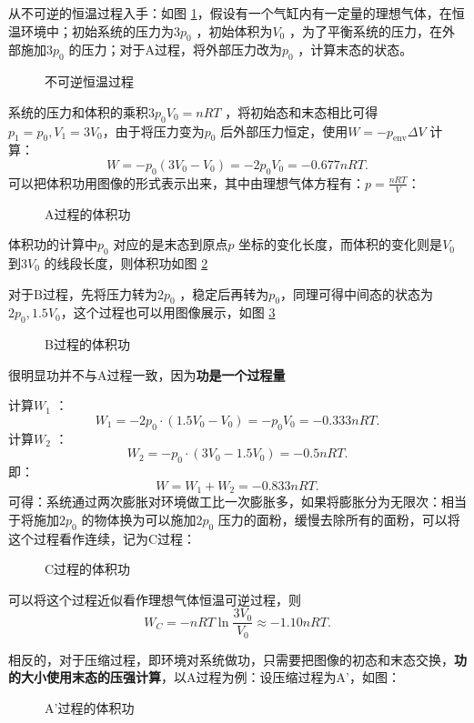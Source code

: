 \begin{eg}
    从不可逆的恒温过程入手：如图 \ref{fig:不可逆恒温过程}，假设有一个气缸内有一定量的理想气体，在恒温环境中；初始系统的压力为$3p_0$ ，初始体积为$V_0$ ，为了平衡系统的压力，在外部施加$3p_0$ 的压力；对于A过程，将外部压力改为$p_0$ ，计算末态的状态。
\begin{figure}[ht!]
    \centering
    \caption{不可逆恒温过程}
    \label{fig:不可逆恒温过程}
\end{figure}

    系统的压力和体积的乘积$3p_0V_0 = nRT $ ，将初始态和末态相比可得$p_1 =p_0, V_1 = 3V_0$，由于将压力变为$p_0$ 后外部压力恒定，使用$W=-p_\text{env}\Delta V$ 计算：\[
        W = -p_0\left( 3V_0-V_0 \right) = -2p_0V_0 = -0.677nRT 
    .\]
    可以把体积功用图像的形式表示出来，其中由理想气体方程有：$p=\frac{nRT }{V}$：
\begin{figure}[ht!]
    \centering
    \caption{A过程的体积功}
    \label{fig:a过程的体积功}
\end{figure}

体积功的计算中$p_0$ 对应的是末态到原点$p$ 坐标的变化长度，而体积的变化则是$V_0$ 到$3V_0$ 的线段长度，则体积功如图 \ref{fig:a过程的体积功}

对于B过程，先将压力转为$2p_0$ ，稳定后再转为$p_0$，同理可得中间态的状态为$2p_0,1.5V_0$，这个过程也可以用图像展示，如图 \ref{fig:b过程的体积功}
\begin{figure}[ht!]
    \centering
    \caption{B过程的体积功}
    \label{fig:b过程的体积功}
\end{figure}

很明显功并不与A过程一致，因为\textbf{功是一个过程量}

计算$W_1$ ：\[
    W_1 = -2p_0\cdot \left( 1.5V_0-V_0 \right) = -p_0V_0 = -0.333nRT 
.\]
计算$W_2$ ：\[
    W_2 = -p_0\cdot \left( 3V_0-1.5V_0 \right) = -0.5nRT 
.\]
即：\[
    W = W_1 + W_2 = -0.833nRT 
.\]
可得：系统通过两次膨胀对环境做工比一次膨胀多，如果将膨胀分为无限次：相当于将施加$2p_0$ 的物体换为可以施加$2p_0$ 压力的面粉，缓慢去除所有的面粉，可以将这个过程看作连续，记为C过程：
\begin{figure}[ht!]
    \centering
    \caption{C过程的体积功}
    \label{fig:c过程的体积功}
\end{figure}

可以将这个过程近似看作理想气体恒温可逆过程，则 \[
    W_C = -nRT \ln \frac{3V_0}{V_0} \approx -1.10nRT 
.\]
\end{eg}
相反的，对于压缩过程，即环境对系统做功，只需要把图像的初态和末态交换，\textbf{功的大小使用末态的压强计算}，以A过程为例：设压缩过程为A'，如图：
\begin{figure}[ht]
    \centering
    \caption{A'过程的体积功 }
    \label{fig:a'过程的体积功}
\end{figure}

